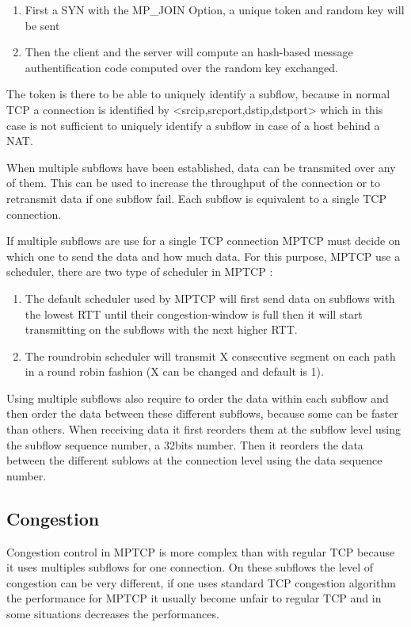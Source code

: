   \begin{enumerate}
    \item First a SYN with the MP\_JOIN Option, a unique token and random key will be sent
    \item Then the client and the server will compute an hash-based message authentification code computed over the random key exchanged.
  \end{enumerate}

  The token is there to be able to uniquely identify a subflow, because in normal TCP a connection is identified by <srcip,srcport,dstip,dstport>
  which in this case is not sufficient to uniquely identify a subflow in case of a host behind a NAT.

  When multiple subflows have been established, data can be transmited over any of them. This can be used to increase the throughput of the connection or
  to retransmit data if one subflow fail. Each subflow is equivalent to a single TCP connection.

  If multiple subflows are use for a single TCP connection MPTCP must decide on which one to send the data and how much data.
  For this purpose, MPTCP use a scheduler, there are two type of scheduler in MPTCP :

  \begin {enumerate}
    \item The default scheduler used by MPTCP will first send data on subflows with the lowest RTT until their congestion-window is full then it will start transmitting on the subflows with the next higher RTT.
    \item The roundrobin scheduler will transmit X consecutive segment on each path in a round robin fashion (X can be changed and default is 1).
  \end{enumerate}

  Using multiple subflows also require to order the data within each subflow and then order the data between these different subflows, because some can be faster than others.
  When receiving data it first reorders them at the subflow level using the subflow sequence number, a 32bits number. Then it reorders the data between the different sublows at the connection level using the data sequence number.

  \subsection{Congestion}

  Congestion control in MPTCP is more complex than with regular TCP because it uses multiples subflows for one connection.
  On these subflows the level of congestion can be very different, if one uses standard TCP congestion algorithm the performance for MPTCP it usually become unfair to regular TCP and
  in some situations decreases the performances.

